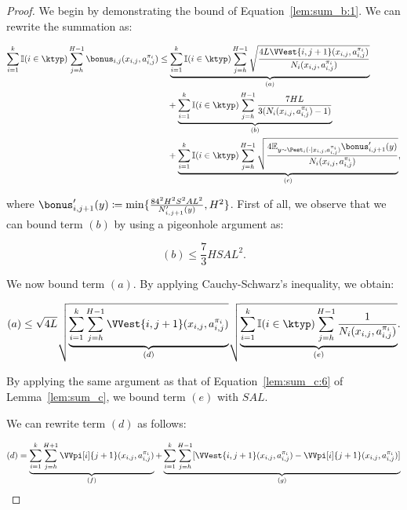 \begin{proof}
We begin by demonstrating the bound of Equation~\eqref{lem:sum_b:1}. We can rewrite the summation as:

\begin{align}
    \begin{split}
    \label{lem:sum_b:3}
        \sum_{i=1}^k \mathbb{I}(i \in \ktyp) \sum_{j=h}^{H-1} \bonus_{i,j}(x_{i,j}, a_{i,j}^{\pi_i}) &\le \underbrace{\sum_{i=1}^k \mathbb{I}(i \in \ktyp) \sum_{j=h}^{H-1} \sqrt{\frac{4 L \VVest{i,j+1}(x_{i,j}, a_{i,j}^{\pi_i})}{N_i(x_{i,j},a_{i,j}^{\pi_i})}}}_{(a)} \\
        &\quad + \underbrace{\sum_{i=1}^k \mathbb{I}(i \in \ktyp) \sum_{j=h}^{H-1} \frac{7HL}{3 (N_i(x_{i,j},a_{i,j}^{\pi_i}) - 1)}}_{(b)} \\
        &\quad + \underbrace{\sum_{i=1}^k \mathbb{I}(i \in \ktyp) \sum_{j=h}^{H-1} \sqrt{\frac{4 \mathbb{E}_{y \sim \Pest_i(\cdot|x_{i,j},a_{i,j}^{\pi_i})} \bonus'_{i,j+1}(y)}{N_i(x_{i,j}, a_{i,j}^{\pi_i})}}}_{(c)},
    \end{split}
\end{align}

where $\bonus'_{i,j+1}(y) \coloneqq \min \{ \frac{84^2 H^2 S^2 A L^2}{N'_{i,j+1}(y)}, H^2 \}$. First of all, we observe that we can bound term $(b)$ by using a pigeonhole argument as:

\begin{equation}
\label{lem:sum_b:4}
    (b) \le \frac{7}{3} HSAL^2.
\end{equation}

We now bound term $(a)$. By applying Cauchy-Schwarz's inequality, we obtain:

\begin{equation}
\label{lem:sum_b:5}
    (a) \le \sqrt{4L} \sqrt{\underbrace{\sum_{i=1}^k \sum_{j=h}^{H-1} \VVest{i,j+1}(x_{i,j}, a_{i,j}^{\pi_i})}_{(d)}} \sqrt{\underbrace{\sum_{i=1}^k \mathbb{I}(i \in \ktyp) \sum_{j=h}^{H-1} \frac{1}{N_i (x_{i,j}, a_{i,j}^{\pi_i})}}_{(e)}}.
\end{equation}

By applying the same argument as that of Equation~\eqref{lem:sum_c:6} of Lemma~\ref{lem:sum_c}, we bound term $(e)$ with $SAL$.

We can rewrite term $(d)$ as follows:

\begin{equation}
\label{lem:sum_b:6}
    (d) = \underbrace{\sum_{i=1}^k \sum_{j=h}^{H+1} \VVpi[i]{j+1}(x_{i,j}, a_{i,j}^{\pi_i})}_{(f)} + \underbrace{\sum_{i=1}^k \sum_{j=h}^{H-1} [\VVest{i,j+1} (x_{i,j}, a_{i,j}^{\pi_i}) - \VVpi[i]{j+1}(x_{i,j}, a_{i,j}^{\pi_i})]}_{(g)}
\end{equation}


\end{proof}
